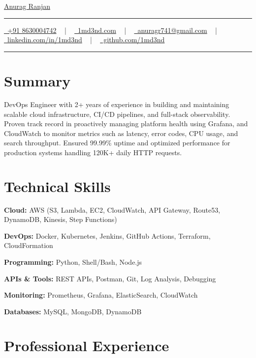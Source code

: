 \documentclass[letterpaper,10pt]{article}
\newcommand{\documentTitle}[2]{
  \begin{center}
    {\Huge\color{accentTitle} #1}
    \vspace{10pt}
    {\color{accentLine} \hrule}
    \vspace{2pt}
    \footnotesize{#2}
    \vspace{2pt}
    {\color{accentLine} \hrule}
  \end{center}
}
\newenvironment{resume_list}{
  \vspace{-6pt}
  \begin{itemize}[itemsep=2pt, leftmargin=18pt]
}{\end{itemize}}
\begin{document}
\documentTitle{\href{https://1md3nd.com}{Anurag Ranjan}}{
    \href{tel:+918630004742}{\raisebox{-0.15\height} \faMobile\ +91 8630004742} ~ | ~
    \href{https://www.1md3nd.com}{\raisebox{-0.15\height} \faGlobe\ 1md3nd.com} ~ | ~
    \href{mailto:anuragr741@gmail.com}{\raisebox{-0.15\height} \faEnvelope\ anuragr741@gmail.com} ~ | ~
    \href{https://linkedin.com/in/1md3nd}{\raisebox{-0.15\height} \faLinkedin\ linkedin.com/in/1md3nd} ~ | ~
    \href{https://github.com/1md3nd}{\raisebox{-0.15\height} \faGithub\ github.com/1md3nd}
}

\section{Summary}
DevOps Engineer with 2+ years of experience in building and maintaining scalable cloud infrastructure, CI/CD pipelines, and full-stack observability. Proven track record in proactively managing platform health using Grafana, and CloudWatch to monitor metrics such as latency, error codes, CPU usage, and search throughput. Ensured 99.99\% uptime and optimized performance for production systems handling 120K+ daily HTTP requests.

\section{Technical Skills}
\begin{resume_list}
  \item \textbf{Cloud:} AWS (S3, Lambda, EC2, CloudWatch, API Gateway, Route53, DynamoDB, Kinesis, Step Functions)
  \item \textbf{DevOps:} Docker, Kubernetes, Jenkins, GitHub Actions, Terraform, CloudFormation
  \item \textbf{Programming:} Python, Shell/Bash, Node.js
  \item \textbf{APIs \& Tools:} REST APIs, Postman, Git, Log Analysis, Debugging
  \item \textbf{Monitoring:} Prometheus, Grafana, ElasticSearch, CloudWatch
  \item \textbf{Databases:} MySQL, MongoDB, DynamoDB
\end{resume_list}

\section{Professional Experience}
\end{document}
